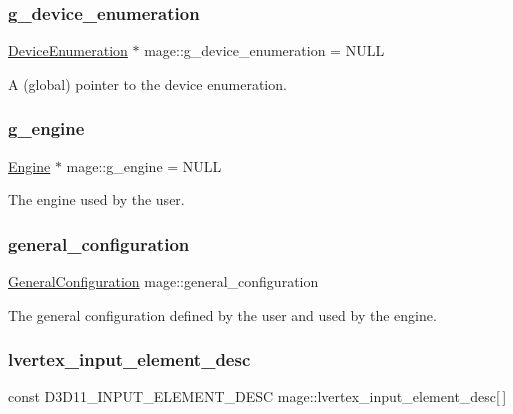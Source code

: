 \subsubsection{\texorpdfstring{g\+\_\+device\+\_\+enumeration}{g\_device\_enumeration}}
{\footnotesize\ttfamily \hyperlink{classmage_1_1_device_enumeration}{Device\+Enumeration} $\ast$ mage\+::g\+\_\+device\+\_\+enumeration = N\+U\+LL}

A (global) pointer to the device enumeration. \hypertarget{namespacemage_a84bf83f1e8779d884452cdf08f56c19a}{}\label{namespacemage_a84bf83f1e8779d884452cdf08f56c19a} 
\subsubsection{\texorpdfstring{g\+\_\+engine}{g\_engine}}
{\footnotesize\ttfamily \hyperlink{classmage_1_1_engine}{Engine} $\ast$ mage\+::g\+\_\+engine = N\+U\+LL}

The engine used by the user. \hypertarget{namespacemage_a1f4290d574030d412ca0f2f51b1a2057}{}\label{namespacemage_a1f4290d574030d412ca0f2f51b1a2057} 
\subsubsection{\texorpdfstring{general\+\_\+configuration}{general\_configuration}}
{\footnotesize\ttfamily \hyperlink{structmage_1_1_general_configuration}{General\+Configuration} mage\+::general\+\_\+configuration}

The general configuration defined by the user and used by the engine. \hypertarget{namespacemage_ae6b56f20c8e8917ef1be8d9e4cef3ea3}{}\label{namespacemage_ae6b56f20c8e8917ef1be8d9e4cef3ea3} 
\subsubsection{\texorpdfstring{lvertex\+\_\+input\+\_\+element\+\_\+desc}{lvertex\_input\_element\_desc}}
{\footnotesize\ttfamily const D3\+D11\+\_\+\+I\+N\+P\+U\+T\+\_\+\+E\+L\+E\+M\+E\+N\+T\+\_\+\+D\+E\+SC mage\+::lvertex\+\_\+input\+\_\+element\+\_\+desc\mbox{[}$\,$\mbox{]}}

